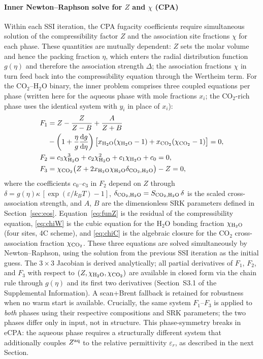\documentclass[preprint,12pt,number]{elsarticle}
\begin{document}
\paragraph{Inner Newton--Raphson solve for $Z$ and $\chi$ (CPA)}
Within each SSI iteration, the CPA fugacity coefficients require simultaneous solution of
the compressibility factor $Z$ and the association site fractions $\chi$ for each phase.
These quantities are mutually dependent: $Z$ sets the molar volume and hence the packing
fraction $\eta$, which enters the radial distribution function $g(\eta)$ and therefore the
association strength $\Delta$; the association fractions $\chi$ in turn feed back into the
compressibility equation through the Wertheim term.
For the CO$_2$--H$_2$O binary, the inner problem comprises three coupled equations per phase
(written here for the aqueous phase with mole fractions $x_i$; the CO$_2$-rich phase uses
the identical system with $y_i$ in place of $x_i$):
\begin{align}
  F_1 &= Z - \frac{Z}{Z - B} + \frac{A}{Z + B} \nonumber\\
       &  - \left(1 + \frac{\eta}{g}\frac{\mathrm{d}g}{\mathrm{d}\eta}\right)
         \bigl[x_{\rm H_2O}(\chi_{\rm H_2O} - 1) + x_{\rm CO_2}(\chi_{\rm CO_2} - 1)\bigr] = 0,
         \label{eq:funZ} \\
  F_2 &= c_3 \chi_{\rm H_2O}^3 + c_2 \chi_{\rm H_2O}^2 + c_1 \chi_{\rm H_2O} + c_0 = 0,
         \label{eq:chiW} \\
  F_3 &= \chi_{\rm CO_2} \bigl(Z + 2 x_{\rm H_2O} \chi_{\rm H_2O} \delta_{{\rm CO_2},{\rm H_2O}}\bigr) - Z = 0,
         \label{eq:chiC}
\end{align}
where the coefficients $c_0$--$c_3$ in $F_2$ depend on $Z$ through $\delta = g(\eta)\kappa\,[\exp(\varepsilon/k_BT)-1]$,
$\delta_{{\rm CO_2},{\rm H_2O}} = S_{{\rm CO_2},{\rm H_2O}}\,\delta$ is the scaled cross-association strength, and
$A$, $B$ are the dimensionless SRK parameters defined in Section~\ref{sec:eos}.
Equation~\eqref{eq:funZ} is the residual of the compressibility equation,
\eqref{eq:chiW} is the cubic equation for the H$_2$O bonding fraction $\chi_{\rm H_2O}$
(four sites, 4C scheme), and \eqref{eq:chiC} is the algebraic closure for the CO$_2$
cross-association fraction $\chi_{\rm CO_2}$.
These three equations are solved simultaneously by Newton--Raphson, using the
solution from the previous SSI iteration as the initial guess.
The $3\times 3$ Jacobian is derived analytically; all partial derivatives of $F_1$,
$F_2$, and $F_3$ with respect to $(Z, \chi_{\rm H_2O}, \chi_{\rm CO_2})$ are available in closed form
via the chain rule through $g(\eta)$ and its first two derivatives
(Section~S3.1 of the Supplemental Information).
A scan+Brent fallback is retained for robustness when no warm start is available.
Crucially, the same system $F_1$--$F_3$ is applied to \emph{both} phases using their
respective compositions and SRK parameters; the two phases differ
only in input, not in structure.
This phase-symmetry breaks in eCPA: the aqueous phase requires a structurally
different system that additionally couples $Z^{\rm aq}$ to the relative permittivity
$\varepsilon_r$, as described in the next Section.
\end{document}
